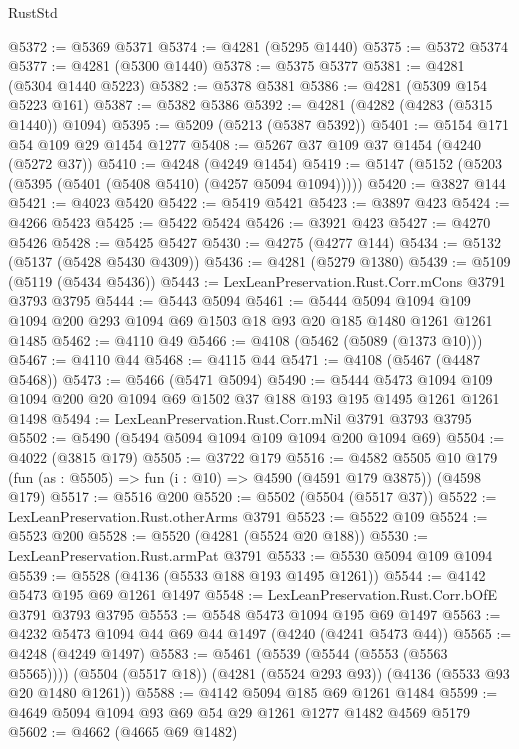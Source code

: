\begin{lexlean}{RustStd}
\begin{coremodule}
@5372 := @5369 @5371
@5374 := @4281 (@5295 @1440)
@5375 := @5372 @5374
@5377 := @4281 (@5300 @1440)
@5378 := @5375 @5377
@5381 := @4281 (@5304 @1440 @5223)
@5382 := @5378 @5381
@5386 := @4281 (@5309 @154 @5223 @161)
@5387 := @5382 @5386
@5392 := @4281 (@4282 (@4283 (@5315 @1440)) @1094)
@5395 := @5209 (@5213 (@5387 @5392))
@5401 := @5154 @171 @54 @109 @29 @1454 @1277
@5408 := @5267 @37 @109 @37 @1454 (@4240 (@5272 @37))
@5410 := @4248 (@4249 @1454)
@5419 := @5147 (@5152 (@5203 (@5395 (@5401 (@5408 @5410) (@4257 @5094 @1094)))))
@5420 := @3827 @144
@5421 := @4023 @5420
@5422 := @5419 @5421
@5423 := @3897 @423
@5424 := @4266 @5423
@5425 := @5422 @5424
@5426 := @3921 @423
@5427 := @4270 @5426
@5428 := @5425 @5427
@5430 := @4275 (@4277 @144)
@5434 := @5132 (@5137 (@5428 @5430 @4309))
@5436 := @4281 (@5279 @1380)
@5439 := @5109 (@5119 (@5434 @5436))
@5443 := LexLeanPreservation.Rust.Corr.mCons @3791 @3793 @3795
@5444 := @5443 @5094
@5461 := @5444
    @5094
    @1094
    @109
    @1094
    @200
    @293
    @1094
    @69
    @1503
    @18
    @93
    @20
    @185
    @1480
    @1261
    @1261
    @1485
@5462 := @4110 @49
@5466 := @4108 (@5462 (@5089 (@1373 @10)))
@5467 := @4110 @44
@5468 := @4115 @44
@5471 := @4108 (@5467 (@4487 @5468))
@5473 := @5466 (@5471 @5094)
@5490 := @5444
    @5473
    @1094
    @109
    @1094
    @200
    @20
    @1094
    @69
    @1502
    @37
    @188
    @193
    @195
    @1495
    @1261
    @1261
    @1498
@5494 := LexLeanPreservation.Rust.Corr.mNil @3791 @3793 @3795
@5502 := @5490 (@5494 @5094 @1094 @109 @1094 @200 @1094 @69)
@5504 := @4022 (@3815 @179)
@5505 := @3722 @179
@5516 := @4582
    @5505
    @10
    @179
    (fun (as : @5505) => fun (i : @10) => @4590 (@4591 @179 @3875))
    (@4598 @179)
@5517 := @5516 @200
@5520 := @5502 (@5504 (@5517 @37))
@5522 := LexLeanPreservation.Rust.otherArms @3791
@5523 := @5522 @109
@5524 := @5523 @200
@5528 := @5520 (@4281 (@5524 @20 @188))
@5530 := LexLeanPreservation.Rust.armPat @3791
@5533 := @5530 @5094 @109 @1094
@5539 := @5528 (@4136 (@5533 @188 @193 @1495 @1261))
@5544 := @4142 @5473 @195 @69 @1261 @1497
@5548 := LexLeanPreservation.Rust.Corr.bOfE @3791 @3793 @3795
@5553 := @5548 @5473 @1094 @195 @69 @1497
@5563 := @4232 @5473 @1094 @44 @69 @44 @1497 (@4240 (@4241 @5473 @44))
@5565 := @4248 (@4249 @1497)
@5583 := @5461
    (@5539 (@5544 (@5553 (@5563 @5565))))
    (@5504 (@5517 @18))
    (@4281 (@5524 @293 @93))
    (@4136 (@5533 @93 @20 @1480 @1261))
@5588 := @4142 @5094 @185 @69 @1261 @1484
@5599 := @4649 @5094 @1094 @93 @69 @54 @29 @1261 @1277 @1482 @4569 @5179
@5602 := @4662 (@4665 @69 @1482)

\end{coremodule}
\end{lexlean}
